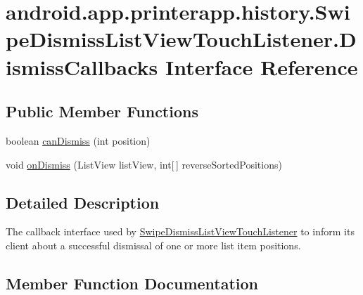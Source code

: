 \hypertarget{interfaceandroid_1_1app_1_1printerapp_1_1history_1_1_swipe_dismiss_list_view_touch_listener_1_1_dismiss_callbacks}{}\section{android.\+app.\+printerapp.\+history.\+Swipe\+Dismiss\+List\+View\+Touch\+Listener.\+Dismiss\+Callbacks Interface Reference}
\label{interfaceandroid_1_1app_1_1printerapp_1_1history_1_1_swipe_dismiss_list_view_touch_listener_1_1_dismiss_callbacks}
\subsection*{Public Member Functions}
\begin{DoxyCompactItemize}
\item 
boolean \hyperlink{interfaceandroid_1_1app_1_1printerapp_1_1history_1_1_swipe_dismiss_list_view_touch_listener_1_1_dismiss_callbacks_ad55266031ea96f33b86ad54efc93645a}{can\+Dismiss} (int position)
\item 
void \hyperlink{interfaceandroid_1_1app_1_1printerapp_1_1history_1_1_swipe_dismiss_list_view_touch_listener_1_1_dismiss_callbacks_a8a4657354a9b07d66103806d51a91ec0}{on\+Dismiss} (List\+View list\+View, int\mbox{[}$\,$\mbox{]} reverse\+Sorted\+Positions)
\end{DoxyCompactItemize}


\subsection{Detailed Description}
The callback interface used by \hyperlink{classandroid_1_1app_1_1printerapp_1_1history_1_1_swipe_dismiss_list_view_touch_listener}{Swipe\+Dismiss\+List\+View\+Touch\+Listener} to inform its client about a successful dismissal of one or more list item positions. 

\subsection{Member Function Documentation}
\mbox{\label{interfaceandroid_1_1app_1_1printerapp_1_1history_1_1_swipe_dismiss_list_view_touch_listener_1_1_dismiss_callbacks_ad55266031ea96f33b86ad54efc93645a}} 
